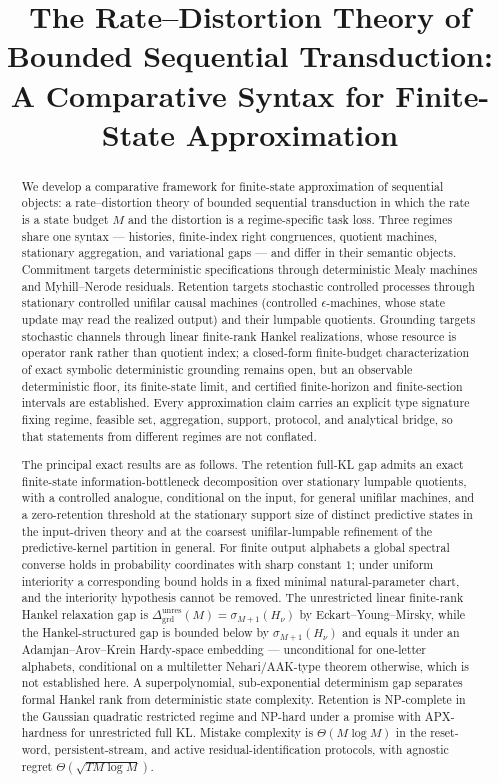 \documentclass[12pt]{article}
\title{
\bfseries
The Rate--Distortion Theory of Bounded Sequential Transduction:\\
A Comparative Syntax for Finite-State Approximation
}
\author{}
\date{}
\theoremstyle{definition}
\newcommand{\Dunres}{\Delta_{\mathrm{grd}}^{\mathrm{unres}}}
\begin{document}
\maketitle

\begin{abstract}
We develop a comparative framework for finite-state approximation of
sequential objects: a rate--distortion theory of bounded sequential
transduction in which the rate is a state budget $M$ and the distortion is a
regime-specific task loss.  Three regimes share one syntax --- histories,
finite-index right congruences, quotient machines, stationary aggregation, and
variational gaps --- and differ in their semantic objects.  Commitment targets
deterministic specifications through deterministic Mealy machines and
Myhill--Nerode residuals.  Retention targets stochastic controlled processes
through stationary controlled unifilar causal machines (controlled
$\epsilon$-machines, whose state update may read the realized output) and
their lumpable quotients.  Grounding targets stochastic channels through
linear finite-rank Hankel realizations, whose resource is operator rank rather
than quotient index; a closed-form finite-budget characterization of exact
symbolic deterministic grounding remains open, but an observable deterministic
floor, its finite-state limit, and certified finite-horizon and finite-section
intervals are established.  Every approximation claim carries an explicit type
signature fixing regime, feasible set, aggregation, support, protocol, and
analytical bridge, so that statements from different regimes are not
conflated.

The principal exact results are as follows.  The retention full-KL gap admits
an exact finite-state information-bottleneck decomposition over stationary
lumpable quotients, with a controlled analogue, conditional on the input, for
general unifilar machines, and a zero-retention threshold at the stationary
support size of distinct predictive states in the input-driven theory and at
the coarsest unifilar-lumpable refinement of the predictive-kernel partition
in general.  For finite output alphabets a global spectral converse holds in
probability coordinates with sharp constant $1$; under uniform interiority a
corresponding bound holds in a fixed minimal natural-parameter chart, and the
interiority hypothesis cannot be removed.  The unrestricted linear finite-rank
Hankel relaxation gap is $\Dunres(M)=\sigma_{M+1}(H_\nu)$ by
Eckart--Young--Mirsky, while the Hankel-structured gap is bounded below by
$\sigma_{M+1}(H_\nu)$ and equals it under an Adamjan--Arov--Krein
Hardy-space embedding --- unconditional for one-letter alphabets, conditional
on a multiletter Nehari/AAK-type theorem otherwise, which is not established
here.  A superpolynomial, sub-exponential determinism gap separates formal
Hankel rank from deterministic state complexity.  Retention is NP-complete in
the Gaussian quadratic restricted regime and NP-hard under a promise with
APX-hardness for unrestricted full KL.  Mistake complexity is $\Theta(M\log
M)$ in the reset-word, persistent-stream, and active residual-identification
protocols, with agnostic regret $\Theta(\sqrt{TM\log M})$.


\end{abstract}
\end{document}
